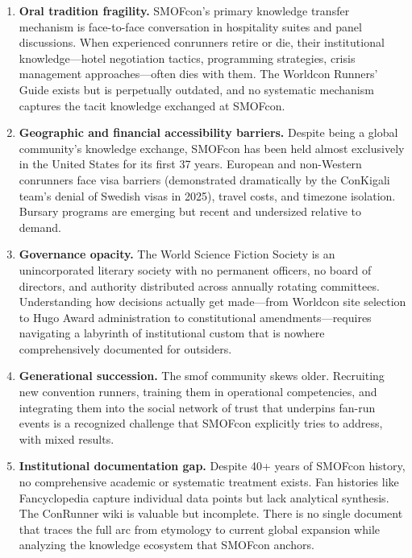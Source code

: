 \documentclass[11pt,letterpaper]{article}
\begin{document}
\begin{enumerate}[leftmargin=2em]
\item \textbf{Oral tradition fragility.} SMOFcon's primary knowledge transfer mechanism is face-to-face conversation in hospitality suites and panel discussions. When experienced conrunners retire or die, their institutional knowledge---hotel negotiation tactics, programming strategies, crisis management approaches---often dies with them. The Worldcon Runners' Guide exists but is perpetually outdated, and no systematic mechanism captures the tacit knowledge exchanged at SMOFcon.

\item \textbf{Geographic and financial accessibility barriers.} Despite being a global community's knowledge exchange, SMOFcon has been held almost exclusively in the United States for its first 37 years. European and non-Western conrunners face visa barriers (demonstrated dramatically by the ConKigali team's denial of Swedish visas in 2025), travel costs, and timezone isolation. Bursary programs are emerging but recent and undersized relative to demand.

\item \textbf{Governance opacity.} The World Science Fiction Society is an unincorporated literary society with no permanent officers, no board of directors, and authority distributed across annually rotating committees. Understanding how decisions actually get made---from Worldcon site selection to Hugo Award administration to constitutional amendments---requires navigating a labyrinth of institutional custom that is nowhere comprehensively documented for outsiders.

\item \textbf{Generational succession.} The smof community skews older. Recruiting new convention runners, training them in operational competencies, and integrating them into the social network of trust that underpins fan-run events is a recognized challenge that SMOFcon explicitly tries to address, with mixed results.

\item \textbf{Institutional documentation gap.} Despite 40+ years of SMOFcon history, no comprehensive academic or systematic treatment exists. Fan histories like Fancyclopedia capture individual data points but lack analytical synthesis. The ConRunner wiki is valuable but incomplete. There is no single document that traces the full arc from etymology to current global expansion while analyzing the knowledge ecosystem that SMOFcon anchors.
\end{enumerate}
\end{document}
